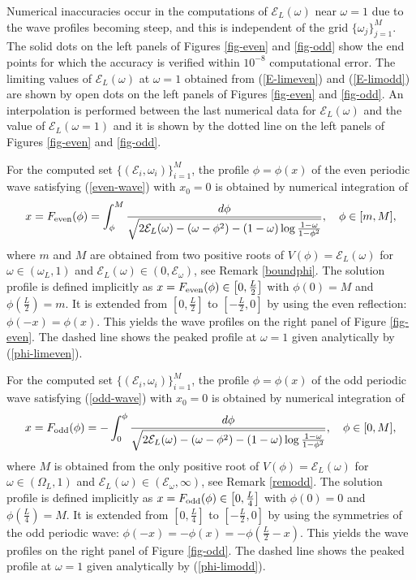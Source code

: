 \documentclass[12pt,reqno]{amsart}
\numberwithin{equation}{section}
\numberwithin{figure}{section}
\begin{document}
Numerical inaccuracies occur in the computations of $\mathcal{E}_L(\omega)$ near $\omega = 1$ due to the wave profiles becoming steep, and this is independent of the grid $\{\omega_j\}_{j=1}^{M}$. The solid dots on the left panels of Figures \ref{fig-even} and \ref{fig-odd} show the end points for which the accuracy is verified within $10^{-8}$ computational error. The limiting values of  $\mathcal{E}_L(\omega)$ at $\omega = 1$ obtained from  (\ref{E-limeven}) and (\ref{E-limodd}) are shown by open dots on the left panels 
of  Figures \ref{fig-even} and \ref{fig-odd}. An interpolation is performed between the last numerical data for $\mathcal{E}_L(\omega)$ and the value of 
$\mathcal{E}_L(\omega = 1)$ and it is shown by the dotted line on the left panels  of Figures \ref{fig-even} and \ref{fig-odd}. 

For the computed set $\{ (\mathcal{E}_i,\omega_i)\}_{i = 1}^M$, the profile $\phi = \phi(x)$ of the even periodic wave satisfying (\ref{even-wave}) with $x_0 = 0$ 
is obtained by numerical integration of  
\begin{equation}
\label{F-even}
x =  F_{\rm even}(\phi) = \int^{M}_{\phi} \frac{d \phi}{\sqrt{2\mathcal E_L(\omega) - (\omega - \phi^2) - (1-\omega)\log\frac{1-\omega}{1-\phi^2}}}, \quad \phi \in [m,M],
\end{equation}
	where $m$ and $M$ are obtained from two positive roots of $V(\phi) = \mathcal{E}_L(\omega)$ for $\omega \in (\omega_L,1)$ and $\mathcal{E}_L(\omega) \in (0,\mathcal{E}_{\omega})$, see Remark \ref{boundphi}. The solution profile is defined implicitly as $x = F_{\rm even}(\phi) \in \left[0,\frac{L}{2}\right]$ with $\phi(0) = M$ and $\phi\left(\frac{L}{2}\right) = m$. It is extended from  $\left[0,\frac{L}{2}\right]$ to $\left[-\frac{L}{2},0\right]$ 
	by using the even reflection: $\phi(-x) = \phi(x)$. This yields the wave profiles on the right panel of Figure \ref{fig-even}. The dashed line shows the peaked profile at $\omega = 1$ given analytically by (\ref{phi-limeven}). 
	
	For the computed set $\{ (\mathcal{E}_i,\omega_i)\}_{i = 1}^M$, the profile $\phi = \phi(x)$ of the odd periodic wave satisfying (\ref{odd-wave}) with $x_0 = 0$ is obtained by numerical integration of  
\begin{equation}
\label{F-odd}
	x =  F_{\rm odd}(\phi ) = -\int_{0}^{\phi} \frac{d \phi}{\sqrt{2\mathcal E_L(\omega) - (\omega - \phi^2) - (1-\omega)\log\frac{1-\omega}{1-\phi^2}}}, \quad \phi \in [0,M],
\end{equation}
		where $M$ is obtained from the only positive root of $V(\phi) = \mathcal{E}_L(\omega)$ for $\omega \in (\Omega_L,1)$ and $\mathcal{E}_L(\omega) \in (\mathcal{E}_{\omega},\infty)$, see Remark \ref{remodd}. The solution profile is defined implicitly as $x = F_{\rm odd}(\phi) \in \left[0,\frac{L}{4}\right]$ with $\phi(0) = 0$ and $\phi\left(\frac{L}{4}\right) = M$. It is extended from $\left[0,\frac{L}{4}\right]$ to $\left[-\frac{L}{2},0\right]$ by using the symmetries of the odd periodic wave: $\phi(-x) = -\phi(x) = -\phi\left(\frac{L}{2} - x\right)$. This yields the wave profiles on the right panel of Figure \ref{fig-odd}. The dashed line shows the peaked profile at $\omega = 1$ given analytically by (\ref{phi-limodd}). 
\end{document}

